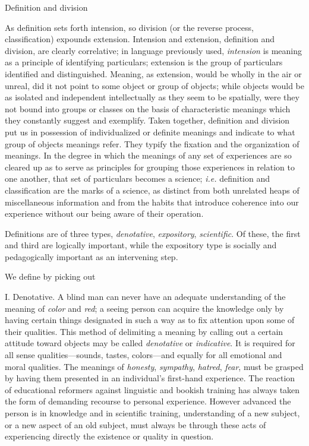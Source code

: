\documentclass[letterpaper]{book}
\begin{document}
Definition and division

As definition sets forth intension, so division (or the reverse process,
classification) expounds extension. Intension and extension, definition
and division, are clearly correlative; in language previously used,
\emph{intension} is meaning as a principle of identifying particulars;
extension is the group of particulars identified and distinguished.
Meaning, as extension, would be wholly in the air or unreal, did it not
point to some object or group of objects; while objects would be as
isolated and independent intellectually as they seem to be spatially,
were they not bound into groups or classes on the basis of
characteristic meanings which they constantly suggest and exemplify.
Taken together, definition and division put us in possession of
individualized or definite meanings and indicate to what group of
objects meanings refer. They typify the fixation and the organization of
meanings. In the degree in which the meanings of any set of experiences
are so cleared up as to serve as principles for grouping those
experiences in relation to one another, that set of particulars becomes
a science; \emph{i.e.} definition and classification are the marks of a
science, as distinct from both unrelated heaps of miscellaneous
information and from the habits that introduce coherence into our
experience without our being aware of their operation.

Definitions are of three types, \emph{denotative}, \emph{expository},
\emph{scientific}. Of these, the first and third are logically
important, while the expository type is socially and pedagogically
important as an intervening step.

We define by picking out

I. Denotative. A blind man can never have an adequate understanding of
the meaning of \emph{color} and \emph{red}; a seeing person can acquire
the knowledge only by
having
certain things designated in such a way as to fix attention upon some of
their qualities. This method of delimiting a meaning by calling out a
certain attitude toward objects may be called \emph{denotative} or
\emph{indicative}. It is required for all sense qualities---sounds,
tastes, colors---and equally for all emotional and moral qualities. The
meanings of \emph{honesty}, \emph{sympathy}, \emph{hatred}, \emph{fear},
must be grasped by having them presented in an individual's first-hand
experience. The reaction of educational reformers against linguistic and
bookish training has always taken the form of demanding recourse to
personal experience. However advanced the person is in knowledge and in
scientific training, understanding of a new subject, or a new aspect of
an old subject, must always be through these acts of experiencing
directly the existence or quality in question.
\end{document}
